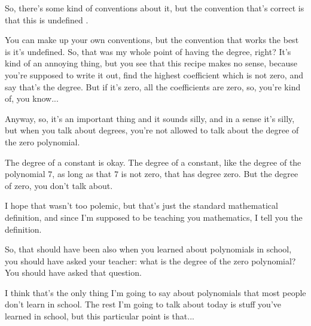 \begin{speech}[00:25:16 - 00:26:46]
So, there's some kind of conventions about it, but the convention that's correct is that this is undefined .

You can make up your own conventions, but the convention that works the best is it's undefined. So, that was my whole point of having the degree, right? It's kind of an annoying thing, but you see that this recipe makes no sense, because you're supposed to write it out, find the highest coefficient which is not zero, and say that's the degree. But if it's zero, all the coefficients are zero, so, you're kind of, you know...

Anyway, so, it's an important thing and it sounds silly, and in a sense it's silly, but when you talk about degrees, you're not allowed to talk about the degree of the zero polynomial.

The degree of a constant is okay. The degree of a constant, like the degree of the polynomial $7$, as long as that $7$ is not zero, that has degree zero. But the degree of zero, you don't talk about.
\end{speech}

\begin{speech}[00:26:46 - 00:27:36]
I hope that wasn't too polemic, but that's just the standard mathematical definition, and since I'm supposed to be teaching you mathematics, I tell you the definition.

So, that should have been also when you learned about polynomials in school, you should have asked your teacher: what is the degree of the zero polynomial? You should have asked that question. 

I think that's the only thing I'm going to say about polynomials that most people don't learn in school. The rest I'm going to talk about today is stuff you've learned in school, but this particular point is that...
\end{speech}


